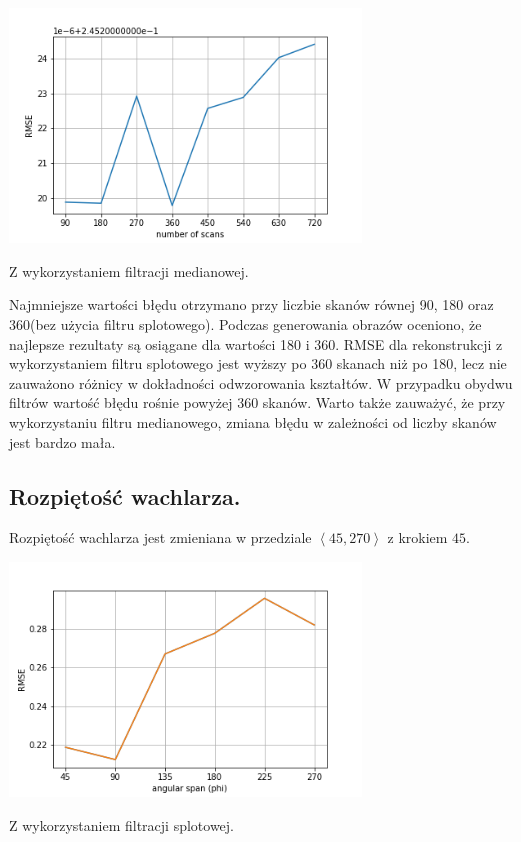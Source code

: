 \documentclass[a4paper, 11pt]{article}
\begin{document}
\begin{center}
	\includegraphics[width=0.7\textwidth]{scans_no_convolve.png}
	
	Z wykorzystaniem filtracji medianowej.
\end{center}

Najmniejsze wartości błędu otrzymano przy liczbie skanów równej 90, 180 oraz 360(bez użycia filtru splotowego). Podczas generowania obrazów oceniono, że najlepsze rezultaty są osiągane dla wartości 180 i 360. RMSE dla rekonstrukcji z wykorzystaniem filtru splotowego jest wyższy po 360 skanach niż po 180, lecz nie zauważono różnicy w dokładności odwzorowania kształtów. W przypadku obydwu filtrów wartość błędu rośnie powyżej 360 skanów. Warto także zauważyć, że przy wykorzystaniu filtru medianowego, zmiana błędu w zależności od liczby skanów jest bardzo mała.

\newpage
\subsection{Rozpiętość wachlarza.}

Rozpiętość wachlarza jest zmieniana w przedziale $\left<45, 270 \right>$ z krokiem $45$.

\begin{center}
	\includegraphics[width=0.7\textwidth]{phi.png}
	
	Z wykorzystaniem filtracji splotowej.
\end{center}
\end{document}
